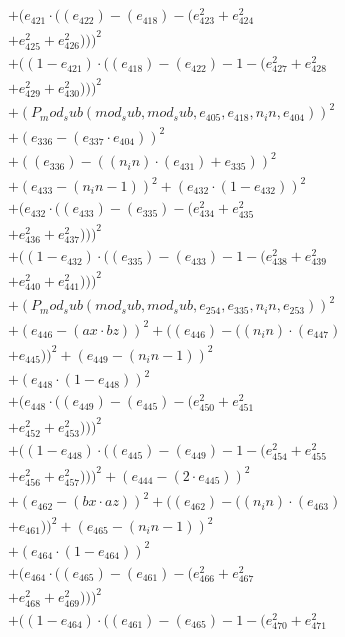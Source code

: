 \documentclass[10pt, a4paper]{article}
\begin{document}
\begin{align*}
& + (e_{421}  \cdot  ((e_{422}) - (e_{418}) - (e_{423}^{2} + e_{424}^{2} \\
& + e_{425}^{2} + e_{426}^{2})))^{2} \\
& + ((1 - e_{421})  \cdot  ((e_{418}) - (e_{422}) - 1 - (e_{427}^{2} + e_{428}^{2} \\
& + e_{429}^{2} + e_{430}^{2})))^{2} \\
& + (P_mod_sub(mod_sub, mod_sub, e_{405}, e_{418}, n_in, e_{404}))^{2} \\
& + (e_{336} - (e_{337}  \cdot  e_{404}))^{2} \\
& + ((e_{336}) - ((n_in)  \cdot  (e_{431}) + e_{335}))^{2} \\
& + (e_{433} - (n_in - 1))^{2} + (e_{432}  \cdot  (1 - e_{432}))^{2} \\
& + (e_{432}  \cdot  ((e_{433}) - (e_{335}) - (e_{434}^{2} + e_{435}^{2} \\
& + e_{436}^{2} + e_{437}^{2})))^{2} \\
& + ((1 - e_{432})  \cdot  ((e_{335}) - (e_{433}) - 1 - (e_{438}^{2} + e_{439}^{2} \\
& + e_{440}^{2} + e_{441}^{2})))^{2} \\
& + (P_mod_sub(mod_sub, mod_sub, e_{254}, e_{335}, n_in, e_{253}))^{2} \\
& + (e_{446} - (ax  \cdot  bz))^{2} + ((e_{446}) - ((n_in)  \cdot  (e_{447}) \\
& + e_{445}))^{2} + (e_{449} - (n_in - 1))^{2} \\
& + (e_{448}  \cdot  (1 - e_{448}))^{2} \\
& + (e_{448}  \cdot  ((e_{449}) - (e_{445}) - (e_{450}^{2} + e_{451}^{2} \\
& + e_{452}^{2} + e_{453}^{2})))^{2} \\
& + ((1 - e_{448})  \cdot  ((e_{445}) - (e_{449}) - 1 - (e_{454}^{2} + e_{455}^{2} \\
& + e_{456}^{2} + e_{457}^{2})))^{2} + (e_{444} - (2  \cdot  e_{445}))^{2} \\
& + (e_{462} - (bx  \cdot  az))^{2} + ((e_{462}) - ((n_in)  \cdot  (e_{463}) \\
& + e_{461}))^{2} + (e_{465} - (n_in - 1))^{2} \\
& + (e_{464}  \cdot  (1 - e_{464}))^{2} \\
& + (e_{464}  \cdot  ((e_{465}) - (e_{461}) - (e_{466}^{2} + e_{467}^{2} \\
& + e_{468}^{2} + e_{469}^{2})))^{2} \\
& + ((1 - e_{464})  \cdot  ((e_{461}) - (e_{465}) - 1 - (e_{470}^{2} + e_{471}^{2} \\

\end{align*}
\end{document}
